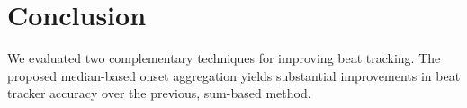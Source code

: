 \documentclass{article}
\begin{document}

\section{Conclusion}
\label{sec:conclusion}
We evaluated two complementary techniques for improving beat tracking.
The proposed median-based onset aggregation yields substantial improvements in beat
tracker accuracy over the previous, sum-based method.  




\end{document}

